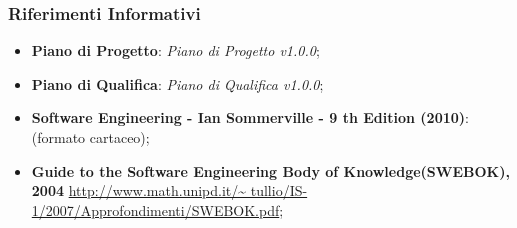 \subsubsection{Riferimenti Informativi}
\begin{itemize}
	\item \textbf{Piano di Progetto}: \textit{Piano di Progetto v1.0.0};
	\item \textbf{Piano di Qualifica}: \textit{Piano di Qualifica v1.0.0};
	\item \textbf{Software Engineering - Ian Sommerville - 9 th Edition (2010)}:
	(formato cartaceo);
	\item \textbf{Guide to the Software Engineering Body of Knowledge(SWEBOK), 2004}
		\url{http://www.math.unipd.it/~	tullio/IS-1/2007/Approfondimenti/SWEBOK.pdf};

	
	
	
	
	
	
\end{itemize}


